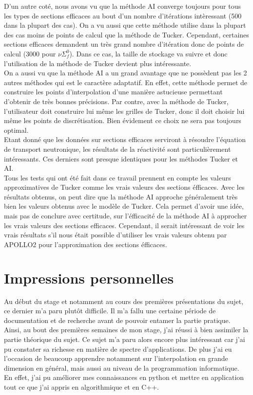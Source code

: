 D'un autre coté, nous avons vu que la méthode AI converge toujours pour tous les types de sections efficaces au bout d'un nombre d'itérations intèressant (500 dans la plupart des cas). On a vu aussi que cette méthode utilise dans la plupart des cas moins de points de calcul que la méthode de Tucker.
Cependant, certaines sections efficaces demandent un très grand nombre d'itération donc de points de calcul (3000 pour $\nu\Sigma_f^0$). Dans ce cas, la taille de stockage va suivre et donc l'utilisation de la méthode de Tucker devient plus intéressante.\\

On a aussi vu que la méthode AI a un grand avantage que ne possèdent pas les 2 autres méthodes qui est le caractère adaptatif. En effet, cette méthode permet de construire les points d'interpolation d'une manière astucieuse permettant d'obtenir de très bonnes précisions. Par contre, avec la méthode de Tucker, l'utilisateur doit construire lui même les grilles de Tucker, donc il doit choisir lui même les points de discrétisation. Bien évidement ce choix ne sera pas toujours optimal. \\
Etant donné que les données sur sections efficaces serviront à résoudre l'équation de transport neutronique, les résultats de la réactivité sont particulièrement intéressants. Ces derniers sont presque identiques pour les méthodes Tucker et AI.\\

Tous les tests qui ont été fait dans ce travail prennent en compte les valeurs approximatives de Tucker comme les vrais valeurs des sections éfficaces. Avec les résultats obtenus, on peut dire que la méthode AI approche généralement très bien les valeurs obtenus avec le modèle de Tucker.
Cela permet d'avoir une idée, mais pas de conclure avec certitude, sur l'éfficacité de la méthode AI à approcher les vrais valeurs des sections efficaces. Cependant, il serait intéressant de voir les vrais résultats s'il nous était possible d'utiliser les vrais valeurs obtenu par APOLLO2 pour l'approximation des sections éfficaces.

\newpage

\section{Impressions personnelles}\label{sec:6}
\hspace{0.5cm} Au début du stage et notamment au cours des premières présentations du sujet, ce dernier m'a paru plutôt difficile. Il m'a fallu une certaine période de documentation et de recherche avant de pouvoir entamer la partie pratique. Ainsi, au bout des premières semaines de mon stage, j'ai réussi à bien assimiler la partie théorique du sujet. Ce sujet m'a paru alors encore plus intéressant car j'ai pu constater sa richesse en matière de spectre d'applications. De plus j'ai eu l'occasion de beaucoup apprendre notamment sur l'interpolation en grande dimension en général, mais aussi au niveau de la programmation informatique. En effet, j'ai pu améliorer mes connaissances en python et mettre en application tout ce que j'ai appris en algorithmique et en C++.\\

